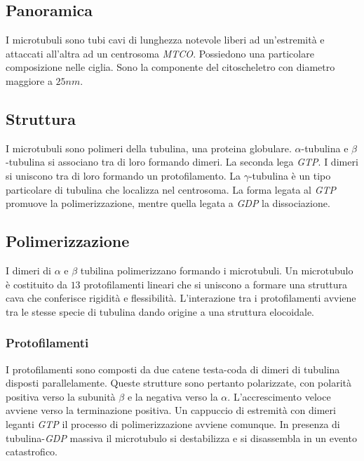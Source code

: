 	\subsection{Panoramica}
	I microtubuli sono tubi cavi di lunghezza notevole liberi ad un'estremit\`a e attaccati all'altra ad un centrosoma \emph{MTCO}.
	Possiedono una particolare composizione nelle ciglia.
	Sono la componente del citoscheletro con diametro maggiore a $25nm$.

	\subsection{Struttura}
	I microtubuli sono polimeri della tubulina, una proteina globulare.
	$\alpha$-tubulina e $\beta$-tubulina si associano tra di loro formando dimeri.
	La seconda lega \emph{GTP}.
	I dimeri si uniscono tra di loro formando un protofilamento.
	La $\gamma$-tubulina \`e un tipo particolare di tubulina che localizza nel centrosoma.
	La forma legata al \emph{GTP} promuove la polimerizzazione, mentre quella legata a \emph{GDP} la dissociazione.

	\subsection{Polimerizzazione}
	I dimeri di $\alpha$ e $\beta$ tubilina polimerizzano formando i microtubuli.
	Un microtubulo \`e costituito da $13$ protofilamenti lineari che si uniscono a formare una struttura cava che conferisce rigidit\`a e flessibilit\`a.
	L'interazione tra i protofilamenti avviene tra le stesse specie di tubulina dando origine a una struttura elocoidale.

		\subsubsection{Protofilamenti}
		I protofilamenti sono composti da due catene testa-coda di dimeri di tubulina disposti parallelamente.
		Queste strutture sono pertanto polarizzate, con polarit\`a positiva verso la subunit\`a $\beta$ e la negativa verso la $\alpha$.
		L'accrescimento veloce avviene verso la terminazione positiva.
		Un cappuccio di estremit\`a con dimeri leganti \emph{GTP} il processo di polimerizzazione avviene comunque.
		In presenza di tubulina-\emph{GDP} massiva il microtubulo si destabilizza e si disassembla in un evento catastrofico.

